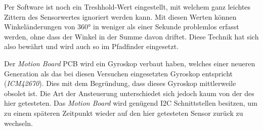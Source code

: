 \documentclass[main.tex]{subfiles} %
\begin{document}
Per Software ist noch ein Treshhold-Wert eingestellt, mit welchem ganz leichtes
Zittern des Sensorwertes ignoriert werden kann. Mit diesen Werten können
Winkeländerungen von 360° in weniger als einer Sekunde problemlos erfasst
werden, ohne dass der Winkel in der Summe davon driftet. Diese Technik hat sich
also bewährt und wird auch so im Pfadfinder eingesetzt.

Der \textit{Motion Board} PCB wird ein Gyroskop verbaut haben, welches einer
neueren Generation als das bei diesen Versuchen eingesetzten Gyroskop
entspricht (\textit{ICM42670}). Dies mit dem Begründung, dass dieses Gyroskop
mittlerweile obsolet ist. Die Art der Ansteuerung unterschiedet sich jedoch
kaum von der des hier getesteten. Das \textit{Motion Board} wird genügend I2C
Schnittstellen besitzen, um zu einem späteren Zeitpunkt wieder auf den hier
getesteten Sensor zurück zu wechseln.
\end{document}

